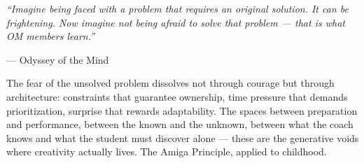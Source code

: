 \documentclass[11pt,letterpaper]{article}
\begin{document}
\vspace{1em}

\begin{quotebox}
\emph{``Imagine being faced with a problem that requires an original solution. It can be frightening. Now imagine not being afraid to solve that problem --- that is what OM members learn.''}

\vspace{0.5em}
\hfill --- Odyssey of the Mind

\vspace{0.8em}
The fear of the unsolved problem dissolves not through courage but through architecture: constraints that guarantee ownership, time pressure that demands prioritization, surprise that rewards adaptability. The spaces between preparation and performance, between the known and the unknown, between what the coach knows and what the student must discover alone --- these are the generative voids where creativity actually lives. The Amiga Principle, applied to childhood.
\end{quotebox}
\end{document}
